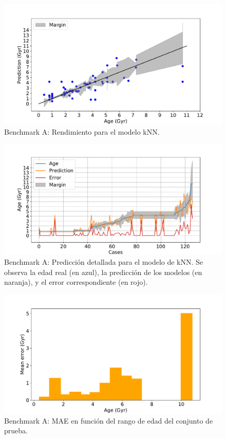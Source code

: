 \begin{figure}[H]
\begin{center}
 \includegraphics[width=0.8\linewidth]{Figuras/Experimentos/B_A_knn_1.pdf}
\end{center}
\caption{Benchmark A: Rendimiento para el modelo kNN.}
 \label{fig:benchA_details_knn_1}
\end{figure}

\begin{figure}[H]
\begin{center}
 \includegraphics[width=0.8\linewidth]{Figuras/Experimentos/B_A_knn_2.pdf}
\end{center}
\caption{Benchmark A: Predicción detallada para el modelo de kNN. Se observa la edad real (en azul), la predicción de los modelos (en naranja), y el error correspondiente (en rojo).}
 \label{fig:benchA_details_knn_2}
\end{figure}

\begin{figure}[H]
\begin{center}
 \includegraphics[width=0.8\linewidth]{Figuras/Experimentos/B_A_knn_3.pdf}
\end{center}
\caption{Benchmark A: MAE en función del rango de edad del conjunto de prueba.}
 \label{fig:benchA_details_knn_3}
\end{figure}

